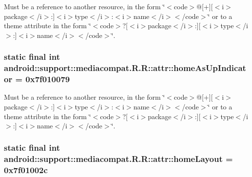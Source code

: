Must be a reference to another resource, in the form \char`\"{}$<$code$>$@\mbox{[}+\mbox{]}\mbox{[}$<$i$>$package$<$/i$>$:\mbox{]}$<$i$>$type$<$/i$>$:$<$i$>$name$<$/i$>$$<$/code$>$\char`\"{} or to a theme attribute in the form \char`\"{}$<$code$>$?\mbox{[}$<$i$>$package$<$/i$>$:\mbox{]}\mbox{[}$<$i$>$type$<$/i$>$:\mbox{]}$<$i$>$name$<$/i$>$$<$/code$>$\char`\"{}. \hypertarget{classandroid_1_1support_1_1mediacompat_1_1_r_1_1attr_a4faf8a0a170e27fc597240efe6adc7d}{
\subsubsection[{homeAsUpIndicator}]{\setlength{\rightskip}{0pt plus 5cm}static final int android::support::mediacompat.R.R::attr::homeAsUpIndicator = 0x7f010079}}
\label{classandroid_1_1support_1_1mediacompat_1_1_r_1_1attr_a4faf8a0a170e27fc597240efe6adc7d}


Must be a reference to another resource, in the form \char`\"{}$<$code$>$@\mbox{[}+\mbox{]}\mbox{[}$<$i$>$package$<$/i$>$:\mbox{]}$<$i$>$type$<$/i$>$:$<$i$>$name$<$/i$>$$<$/code$>$\char`\"{} or to a theme attribute in the form \char`\"{}$<$code$>$?\mbox{[}$<$i$>$package$<$/i$>$:\mbox{]}\mbox{[}$<$i$>$type$<$/i$>$:\mbox{]}$<$i$>$name$<$/i$>$$<$/code$>$\char`\"{}. \hypertarget{classandroid_1_1support_1_1mediacompat_1_1_r_1_1attr_306313530712987c0f840742a69daf5d}{
\subsubsection[{homeLayout}]{\setlength{\rightskip}{0pt plus 5cm}static final int android::support::mediacompat.R.R::attr::homeLayout = 0x7f01002c}}
\label{classandroid_1_1support_1_1mediacompat_1_1_r_1_1attr_306313530712987c0f840742a69daf5d}


